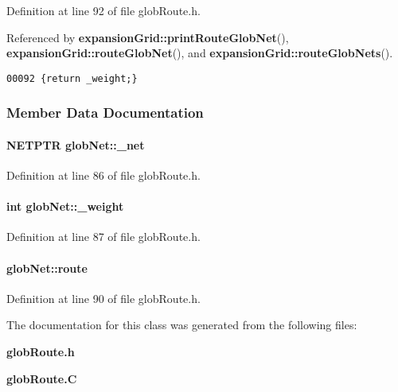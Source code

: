 Definition at line 92 of file glob\-Route.h.

Referenced by {\bf expansion\-Grid::print\-Route\-Glob\-Net}(), {\bf expansion\-Grid::route\-Glob\-Net}(), and {\bf expansion\-Grid::route\-Glob\-Nets}().\small\begin{verbatim}00092 {return _weight;}
\end{verbatim}\normalsize 


\subsubsection{Member Data Documentation}
\label{globNet_o0}
\paragraph{\setlength{\rightskip}{0pt plus 5cm}NETPTR glob\-Net::\_\-net\hspace{0.3cm}{\tt  [private]}}\hfill



Definition at line 86 of file glob\-Route.h.\label{globNet_o1}
\paragraph{\setlength{\rightskip}{0pt plus 5cm}int glob\-Net::\_\-weight\hspace{0.3cm}{\tt  [private]}}\hfill



Definition at line 87 of file glob\-Route.h.\label{globNet_m0}
\paragraph{ glob\-Net::route}\hfill



Definition at line 90 of file glob\-Route.h.

The documentation for this class was generated from the following files:\begin{CompactItemize}
\item 
{\bf glob\-Route.h}\item 
{\bf glob\-Route.C}\end{CompactItemize}
